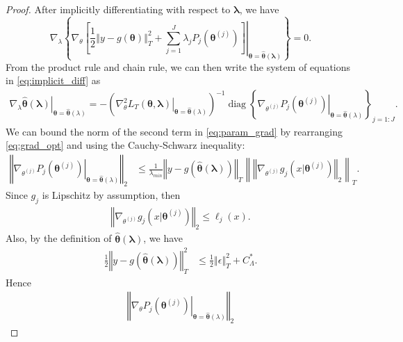 \documentclass[10pt]{book}
\theoremstyle{definition}
\DeclareMathOperator{\diag}{diag}
\begin{document}
\begin{proof}
	After implicitly differentiating with respect to $\boldsymbol{\lambda}$, we have
	\begin{equation}
	\label{eq:implicit_diff}
	\nabla_{\lambda}\left\{ \left.\nabla_{\theta}
	\left [
	\frac{1}{2}\left\Vert y-g(\boldsymbol{\theta})\right\Vert _{T}^{2}
	+ \sum_{j=1}^J \lambda_{j}P_{j}(\boldsymbol{\theta}^{(j)})
	\right ]
	\right|_{\boldsymbol{\theta}=\hat{\boldsymbol{\theta}}(\boldsymbol{\lambda})}\right\} =0.
	\end{equation}
	From the product rule and chain rule, we can then write the system of equations in \eqref{eq:implicit_diff} as
	\begin{align}
	\label{eq:param_grad}
	\left . \nabla_{\lambda}\hat{\boldsymbol{\theta}}(\boldsymbol{\lambda})
	\right|_{\boldsymbol{\theta}=\hat{\boldsymbol{\theta}}(\lambda)}
	= -
	\left (
	\left.\nabla_{\theta}^2
	L_T(\boldsymbol{\theta}, \boldsymbol{\lambda})
	\right|_{\boldsymbol{\theta}=\hat{\boldsymbol{\theta}}(\lambda)} 
	\right)^{-1}
	\diag \left \{
	\left.
	\nabla_{\theta^{(j)}}P_{j}(\boldsymbol{\theta}^{(j)})
	\right|_{\boldsymbol{\theta}=\hat{\boldsymbol{\theta}}(\lambda)}
	\right \}_{j=1:J}
	.
	\end{align}
	We can bound the norm of the second term in \eqref{eq:param_grad} by rearranging \eqref{eq:grad_opt} and using the Cauchy-Schwarz inequality:
	\begin{align*}
		\left\Vert \left.\nabla_{\theta^{(j)}}P_{j}(\boldsymbol{\theta}^{(j)})\right|_{\boldsymbol{\theta}=\hat{\boldsymbol{\theta}}(\lambda)}\right\Vert_2
		&
		\le  \frac{1}{\lambda_{min}}\left\Vert y-g(\hat{\boldsymbol{\theta}}(\boldsymbol{\lambda}))\right\Vert _{T}
		\left \|
		\left\Vert
		\nabla_{\theta^{(j)}}g_{j}(x|\boldsymbol{\theta}^{(j)})
		\right\Vert_{2}
		\right \|_T.
	\end{align*}
	Since $g_j$ is Lipschitz by assumption, then
	\begin{align}
	\left\Vert
	\nabla_{\theta^{(j)}}g_{j}(x|\boldsymbol{\theta}^{(j)})
	\right\Vert_{2}
	\le \ell_j(x).
	\end{align}
	Also, by the definition of $\hat{\boldsymbol{\theta}}(\boldsymbol{\lambda})$, we have
	\begin{align}
	\frac{1}{2}\left\Vert y-g(\hat{\boldsymbol{\theta}}(\boldsymbol{\lambda}))\right\Vert _{T}^{2}
	& \le \frac{1}{2}\left\Vert \epsilon \right \Vert_T^2 + C^*_{\Lambda}.
	\end{align}
	Hence
	\begin{align}
	\left\Vert \left.\nabla_{\theta}P_{j}(\boldsymbol{\theta}^{(j)})\right|_{\boldsymbol{\theta}=\hat{\boldsymbol{\theta}}(\lambda)}\right\Vert_2

\end{align}
\end{proof}
\end{document}

